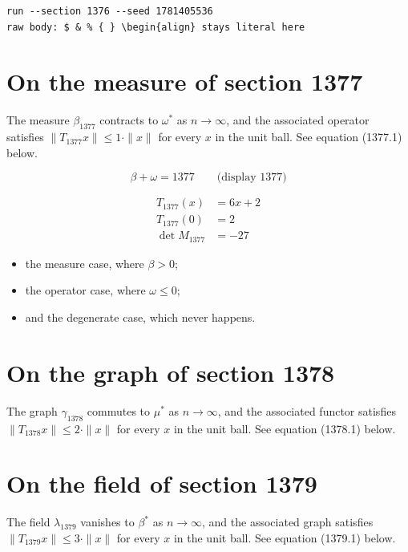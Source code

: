 \documentclass{article}
\begin{document}
\begin{verbatim}
run --section 1376 --seed 1781405536
raw body: $ & % { } \begin{align} stays literal here
\end{verbatim}

\section{On the measure of section 1377}
The measure $\beta_{1377}$ contracts to $\omega^{*}$ as $n \to \infty$,
and the associated operator satisfies $\|T_{1377} x\| \leq 1 \cdot \|x\|$
for every $x$ in the unit ball. See equation (1377.1) below.

$$
\beta + \omega = 1377 \qquad \text{(display 1377)}
$$

\begin{align}
T_{1377}(x) &= 6 x + 2 \\
T_{1377}(0) &= 2 \\
\det M_{1377} &= -27
\end{align}

\begin{itemize}
  \item the measure case, where $\beta > 0$;
  \item the operator case, where $\omega \leq 0$;
  \item and the degenerate case, which never happens.
\end{itemize}

\section{On the graph of section 1378}
The graph $\gamma_{1378}$ commutes to $\mu^{*}$ as $n \to \infty$,
and the associated functor satisfies $\|T_{1378} x\| \leq 2 \cdot \|x\|$
for every $x$ in the unit ball. See equation (1378.1) below.

\section{On the field of section 1379}
The field $\lambda_{1379}$ vanishes to $\beta^{*}$ as $n \to \infty$,
and the associated graph satisfies $\|T_{1379} x\| \leq 3 \cdot \|x\|$
for every $x$ in the unit ball. See equation (1379.1) below.
\end{document}
